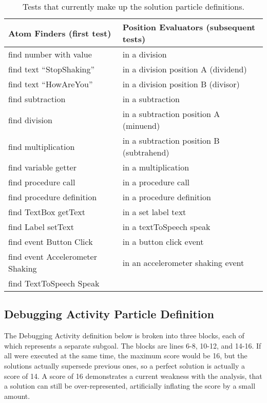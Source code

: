 \begin{table}
\begin{centering}
    \begin{tabular}{l l}
        Atom Finders (first test)           & Position Evaluators (subsequent tests) \\ \hline
        find number with value              & in a division \\
        find text ``StopShaking''           & in a division position A  (dividend)  \\
        find text ``HowAreYou''             & in a division position B  (divisor)   \\
        find subtraction                    & in a subtraction  \\
        find division                       & in a subtraction position A (minuend) \\
        find multiplication                 & in a subtraction position B (subtrahend)  \\
        find variable getter                & in a multiplication   \\
        find procedure call                 & in a procedure call   \\
        find procedure definition           & in a procedure definition \\
        find TextBox getText                & in a set label text   \\
        find Label setText                  & in a textToSpeech speak   \\
        find event Button Click             & in a button click event   \\
        find event Accelerometer Shaking    & in an accelerometer shaking event     \\
        find TextToSpeech Speak             &   \\

    \end{tabular}
    \caption[Particle solution tests]{Tests that currently make up the solution particle definitions.}
    \label{tab:particle-tests-available}
\end{centering}
\end{table}

\subsection{Debugging Activity Particle Definition}
The Debugging Activity definition below %
is broken into three blocks, each of which represents a separate subgoal. The blocks are lines 6-8, 10-12, and 14-16. If all were executed at the same time, the maximum score would be 16, but the solutions actually supersede previous ones, so a perfect solution is actually a score of 14. A score of 16 demonstrates a current weakness with the analysis, that a solution can still be over-represented, artificially inflating the score by a small amount.

